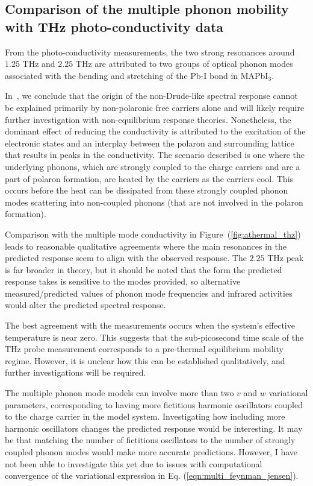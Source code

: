 \subsection{Comparison of the multiple phonon mobility with THz photo-conductivity data}

From the photo-conductivity measurements, the two strong resonances around $1.25$ THz and $2.25$ THz are attributed to two groups of optical phonon modes associated with the bending and stretching of the Pb-I bond in MAPbI$_3$. 

In~\cite{zheng_multipulse_2021}, we conclude that the origin of the non-Drude-like spectral response cannot be explained primarily by non-polaronic free carriers alone and will likely require further investigation with non-equilibrium response theories. Nonetheless, the dominant effect of reducing the conductivity is attributed to the excitation of the electronic states and an interplay between the polaron and surrounding lattice that results in peaks in the conductivity. The scenario described is one where the underlying phonons, which are strongly coupled to the charge carriers and are a part of polaron formation, are heated by the carriers as the carriers cool. This occurs before the heat can be dissipated from these strongly coupled phonon modes scattering into non-coupled phonons (that are not involved in the polaron formation). 

Comparison with the multiple mode conductivity in Figure~(\ref{fig:athermal_thz}) leads to reasonable qualitative agreements where the main resonances in the predicted response seem to align with the observed response. The $2.25$ THz peak is far broader in theory, but it should be noted that the form the predicted response takes is sensitive to the modes provided, so alternative measured/predicted values of phonon mode frequencies and infrared activities would alter the predicted spectral response. 

The best agreement with the measurements occurs when the system's effective temperature is near zero. This suggests that the sub-picosecond time scale of the THz probe measurement corresponds to a pre-thermal equilibrium mobility regime. However, it is unclear how this can be established qualitatively, and further investigations will be required. 

The multiple phonon mode models can involve more than two $v$ and $w$ variational parameters, corresponding to having more fictitious harmonic oscillators coupled to the charge carrier in the model system. Investigating how including more harmonic oscillators changes the predicted response would be interesting. It may be that matching the number of fictitious oscillators to the number of strongly coupled phonon modes would make more accurate predictions. However, I have not been able to investigate this yet due to issues with computational convergence of the variational expression in Eq. (\ref{eqn:multi_feynman_jensen}).

